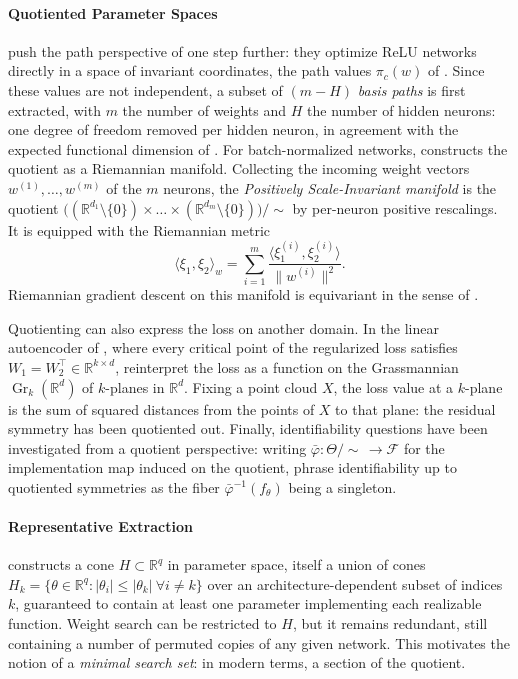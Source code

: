 \documentclass[mathematics,review,submit,moreauthors]{Definitions/mdpi}
\begin{document}
\paragraph{Quotiented Parameter Spaces}
\citet{meng2019} push the path perspective of \citet{neyshabur2015anips} one step further: they optimize ReLU networks directly in a space of invariant coordinates, the path values $\pi_c(w)$ of .
Since these values are not independent, a subset of $(m-H)$ \emph{basis paths} is first extracted, with $m$ the number of weights and $H$ the number of hidden neurons: one degree of freedom removed per hidden neuron, in agreement with the expected functional dimension of .
For batch-normalized networks, \citet{yi2022ptcuai} constructs the quotient as a Riemannian manifold.
Collecting the incoming weight vectors $w^{(1)},\dots,w^{(m)}$ of the $m$ neurons, the \emph{Positively Scale-Invariant manifold} is the quotient $\big((\mathbb{R}^{d_1}\setminus\{0\})\times\dots\times(\mathbb{R}^{d_m}\setminus\{0\})\big)/\!\sim$ by per-neuron positive rescalings.
It is equipped with the Riemannian metric
\begin{equation*}
    \langle\xi_1,\xi_2\rangle_{w}=\sum_{i=1}^{m}\frac{\langle\xi_1^{(i)},\xi_2^{(i)}\rangle}{\lVert w^{(i)}\rVert^2}.
\end{equation*}
Riemannian gradient descent on this manifold is equivariant in the sense of .

Quotienting can also express the loss on another domain.
In the linear autoencoder of , where every critical point of the regularized loss satisfies $W_1=W_2^{\top}\in \mathbb R^{k\times d}$, \citet{kunin2019p3icml} reinterpret the loss as a function on the Grassmannian $\operatorname{Gr}_k(\mathbb{R}^d)$ of $k$-planes in $\mathbb{R}^d$.
Fixing a point cloud $X$, the loss value at a $k$-plane is the sum of squared distances from the points of $X$ to that plane: the residual symmetry has been quotiented out.
Finally, identifiability questions have been investigated from a quotient perspective: writing $\bar\varphi:\Theta/\!\sim\,\to\mathcal{F}$ for the implementation map induced on the quotient, \citet{grillo2026} phrase identifiability up to quotiented symmetries as the fiber $\bar\varphi^{-1}(f_\theta)$ being a singleton.

\paragraph{Representative Extraction}
\citet{hecht-nielsen1990anc} constructs a cone $H\subset\mathbb{R}^q$ in parameter space, itself a union of cones $H_k=\{\theta\in\mathbb{R}^q : |\theta_i|\le|\theta_k|\ \forall i\neq k\}$ over an architecture-dependent subset of indices $k$, guaranteed to contain at least one parameter implementing each realizable function.
Weight search can be restricted to $H$, but it remains redundant, still containing a number of permuted copies of any given network.
This motivates the notion of a \emph{minimal search set}: in modern terms, a section of the quotient.
\end{document}
